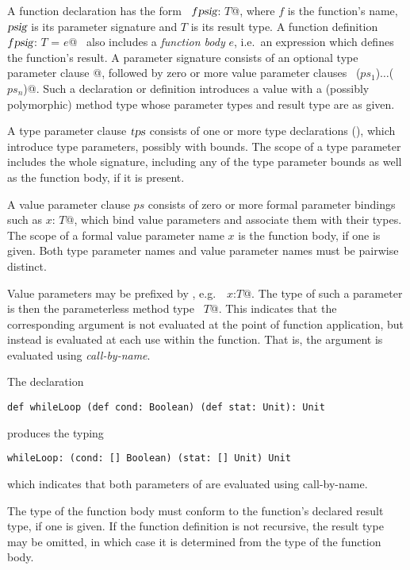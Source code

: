 \documentclass[a4paper,12pt,twoside,titlepage]{book}
\newcommand{\tps}{\mbox{\sl tps}}
\newcommand{\psig}{\mbox{\sl psig}}
\begin{document}
A function declaration has the form ~\lstinline@def $f \psig$: $T$@, where
$f$ is the function's name, $\psig$ is its parameter
signature and $T$ is its result type. A function definition
~\lstinline@$f \psig$: $T$ = $e$@~ also includes a {\em function body} $e$,
i.e.\ an expression which defines the function's result.  A parameter
signature consists of an optional type parameter clause \lstinline@[$\tps\,$]@,
followed by zero or more value parameter clauses
~\lstinline@($ps_1$)$\ldots$($ps_n$)@.  Such a declaration or definition
introduces a value with a (possibly polymorphic) method type whose
parameter types and result type are as given.

A type parameter clause $\tps$ consists of one or more type
declarations (), which introduce type parameters,
possibly with bounds.  The scope of a type parameter includes
the whole signature, including any of the type parameter bounds as
well as the function body, if it is present.  

A value parameter clause $ps$ consists of zero or more formal
parameter bindings such as \lstinline@$x$: $T$@, which bind value
parameters and associate them with their types.  The scope of a formal
value parameter name $x$ is the function body, if one is
given. Both type parameter names and value parameter names must be
pairwise distinct.

Value parameters may be prefixed by , e.g.\
~\lstinline@def $x$:$T$@. The type of such a parameter is then the
parameterless method type ~\lstinline@[]$T$@. This indicates that the
corresponding argument is not evaluated at the point of function
application, but instead is evaluated at each use within the
function. That is, the argument is evaluated using {\em call-by-name}.

\example The declaration
\begin{lstlisting}
def whileLoop (def cond: Boolean) (def stat: Unit): Unit
\end{lstlisting}
produces the typing
\begin{lstlisting}
whileLoop: (cond: [] Boolean) (stat: [] Unit) Unit
\end{lstlisting}
which indicates that both parameters of  are evaluated using
call-by-name.

The type of the function body must conform to the function's declared
result type, if one is given. If the function definition is not
recursive, the result type may be omitted, in which case it is
determined from the type of the function body.
\end{document}
